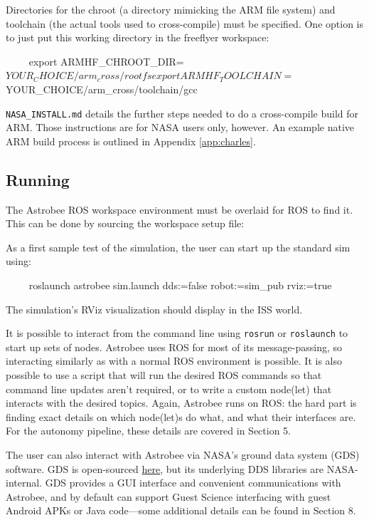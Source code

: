 \documentclass{article}
\begin{document}
Directories for the chroot (a directory mimicking the ARM file system) and toolchain (the actual tools used to cross-compile) must be specified. One option is to just put this working directory in the freeflyer workspace:

\begin{markdown}
~~~~
export ARMHF_CHROOT_DIR=$YOUR_CHOICE/arm_cross/rootfs
export ARMHF_TOOLCHAIN=$YOUR_CHOICE/arm_cross/toolchain/gcc
~~~~
\end{markdown}

\texttt{NASA\_INSTALL.md} details the further steps needed to do a cross-compile build for ARM. Those instructions are for NASA users only, however. An example native ARM build process is outlined in Appendix \ref{app:charles}.

\subsection{Running}
The Astrobee ROS workspace environment must be overlaid for ROS to find it. This can be done by sourcing the workspace setup file:

As a first sample test of the simulation, the user can start up the standard sim using:

\begin{markdown}
~~~~
roslaunch astrobee sim.launch dds:=false robot:=sim_pub rviz:=true
~~~~
\end{markdown}

\noindent The simulation's RViz visualization should display in the ISS world.

It is possible to interact from the command line using \texttt{rosrun} or \texttt{roslaunch} to start up sets of nodes. Astrobee uses ROS for most of its message-passing, so interacting similarly as with a normal ROS environment is possible. It is also possible to use a script that will run the desired ROS commands so that command line updates aren't required, or to write a custom node(let) that interacts with the desired topics. Again, Astrobee runs on ROS: the hard part is finding exact details on which node(let)s do what, and what their interfaces are. For the autonomy pipeline, these details are covered in Section 5.

The user can also interact with Astrobee via NASA's ground data system (GDS) software. GDS is open-sourced \href{https://github.com/nasa/astrobee_gds}{here}, but its underlying DDS libraries are NASA-internal. GDS provides a GUI interface and convenient communications with Astrobee, and by default can support Guest Science interfacing with guest Android APKs or Java code---some additional details can be found in Section 8.
\end{document}
